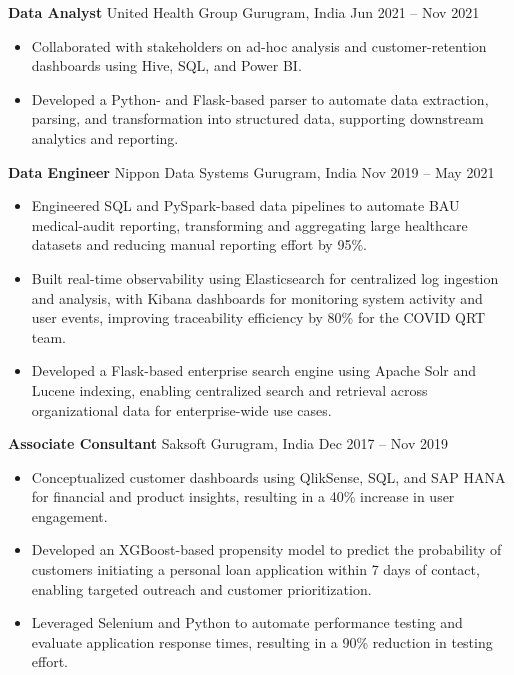 \documentclass[10pt,a4paper]{article}
\newcommand{\role}[4]{\textbf{#1} \textbar{} #2 \hfill #3 \textbar{} #4\par}
\begin{document}
\vspace{3pt}
\role{Data Analyst}{United Health Group}{Gurugram, India}{Jun 2021 -- Nov 2021}
\begin{itemize}
  \item Collaborated with stakeholders on ad-hoc analysis and customer-retention dashboards using Hive, SQL, and Power BI.
  \item Developed a Python- and Flask-based parser to automate data extraction, parsing, and transformation into structured data, supporting downstream analytics and reporting.
\end{itemize}
\vspace{3pt}
\role{Data Engineer}{Nippon Data Systems}{Gurugram, India}{Nov 2019 -- May 2021}
\begin{itemize}
  \item Engineered SQL and PySpark-based data pipelines to automate BAU medical-audit reporting, transforming and aggregating large healthcare datasets and reducing manual reporting effort by 95\%.
  \item Built real-time observability using Elasticsearch for centralized log ingestion and analysis, with Kibana dashboards for monitoring system activity and user events, improving traceability efficiency by 80\% for the COVID QRT team.
  \item Developed a Flask-based enterprise search engine using Apache Solr and Lucene indexing, enabling centralized search and retrieval across organizational data for enterprise-wide use cases.
\end{itemize}
\vspace{3pt}
\role{Associate Consultant}{Saksoft}{Gurugram, India}{Dec 2017 -- Nov 2019}
\begin{itemize}
  \item Conceptualized customer dashboards using QlikSense, SQL, and SAP HANA for financial and product insights, resulting in a 40\% increase in user engagement.
  \item Developed an XGBoost-based propensity model to predict the probability of customers initiating a personal loan application within 7 days of contact, enabling targeted outreach and customer prioritization.
  \item Leveraged Selenium and Python to automate performance testing and evaluate application response times, resulting in a 90\% reduction in testing effort.
\end{itemize}
\end{document}
